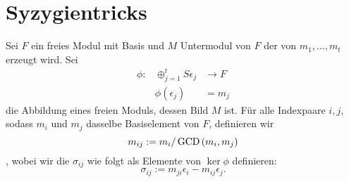 \documentclass{article}
\begin{document}
\section{Syzygientricks}

\begin{nota}
	Sei 
	\( F \) 
	ein freies Modul mit Basis 
	und
	\( M \)
	Untermodul von 
	\( F \)
	der von 
	\( m_{1} , \dots , m_{t} \)
	erzeugt wird.
	Sei
	\begin{align*}
		\phi:	& \oplus_{j=1}^{t} S\epsilon_{j} &\to   F \\
			& \phi\left( \epsilon_{j} \right) &=  m_{j}
	\end{align*}
	die Abbildung eines freien Moduls, dessen Bild
	\( M \)
	ist.
	F\"ur alle Indexpaare 	
	\( i,j \),
	sodass 
	\( m_{i}\)
	und 
	\( m_{j}\)
	dasselbe Basiselement von 
	\( F \),
	definieren wir 
	\[
		m_{ij} := m_{i}/\operatorname{GCD}\left( m_{i},m_{j} \right) 
	\],
	wobei wir die 
	\( \sigma_{ij}\)
	wie folgt als Elemente von 
	\( \ker \phi \)
	definieren:
	\[
		\sigma_{ij} := m_{ji}\epsilon_{i}-m_{ij}\epsilon_{j} .
	\]

\end{nota}
\end{document}
